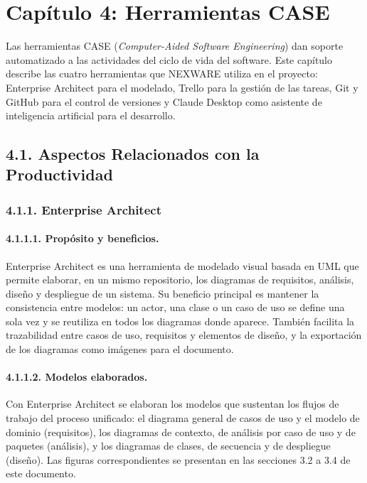 
\newpage
\section{Capítulo 4: Herramientas CASE}\label{cap:case}

Las herramientas CASE (\textit{Computer-Aided Software Engineering}) dan soporte automatizado a las actividades del ciclo de vida del software. Este capítulo describe las cuatro herramientas que NEXWARE utiliza en el proyecto: Enterprise Architect para el modelado, Trello para la gestión de las tareas, Git y GitHub para el control de versiones y Claude Desktop como asistente de inteligencia artificial para el desarrollo.

\subsection{4.1. Aspectos Relacionados con la Productividad}

\subsubsection{4.1.1. Enterprise Architect}

\paragraph{4.1.1.1. Propósito y beneficios.}

Enterprise Architect es una herramienta de modelado visual basada en UML que permite elaborar, en un mismo repositorio, los diagramas de requisitos, análisis, diseño y despliegue de un sistema. Su beneficio principal es mantener la consistencia entre modelos: un actor, una clase o un caso de uso se define una sola vez y se reutiliza en todos los diagramas donde aparece. También facilita la trazabilidad entre casos de uso, requisitos y elementos de diseño, y la exportación de los diagramas como imágenes para el documento.

\paragraph{4.1.1.2. Modelos elaborados.}

Con Enterprise Architect se elaboran los modelos que sustentan los flujos de trabajo del proceso unificado: el diagrama general de casos de uso y el modelo de dominio (requisitos), los diagramas de contexto, de análisis por caso de uso y de paquetes (análisis), y los diagramas de clases, de secuencia y de despliegue (diseño). Las figuras correspondientes se presentan en las secciones 3.2 a 3.4 de este documento.

